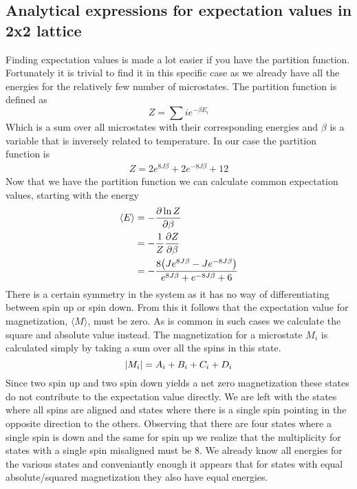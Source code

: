 \documentclass[a4paper, 12pt]{article}
\begin{document}
\subsection{Analytical expressions for expectation values in 2x2 lattice}
	Finding expectation values is made a lot easier if you have the partition function. Fortunately it is trivial to find it in this specific case as we already have all the energies for the relatively few number of microstates. The partition function is defined as
	\begin{equation}
		Z = \sum{i}e^{-\beta E_i}
	\end{equation}
	Which is a sum over all microstates with their corresponding energies and $\beta$ is a variable that is inversely related to temperature. In our case the partition function is
	\begin{align*}
		Z = 2e^{8J\beta}+2e^{-8J\beta}+12
	\end{align*}
	Now that we have the partition function we can calculate common expectation values, starting with the energy
	\begin{align*}
		\langle E \rangle & = - \pdv{\ln{Z}}{\beta}\\
		& = - \frac{1}{Z} \pdv{Z}{\beta} \\
		&= - \frac{8\qty(Je^{8J\beta}-Je^{-8J\beta})}{e^{8J\beta} + e^{-8J\beta} + 6}
	\end{align*}
	There is a certain symmetry in the system as it has no way of differentiating between spin up or spin down. From this it follows that the expectation value for magnetization, $\langle M \rangle$, must be zero. As is common in such cases we calculate the square and absolute value instead. The magnetization for a microstate $M_i$ is calculated simply by taking a sum over all the spins in this state. 
	$$ \abs{M_i} = A_i + B_i + C_i + D_i $$
	Since two spin up and two spin down yields a net zero magnetization these states do not contribute to the expectation value directly. We are left with the states where all spins are aligned and states where there is a single spin pointing in the opposite direction to the others. Observing that there are four states where a single spin is down and the same for spin up we realize that the multiplicity for states with a single spin misaligned must be 8. We already know all energies for the various states and conveniantly enough it appears that for states with equal absolute/squared magnetization they also have equal energies.
\end{document}

